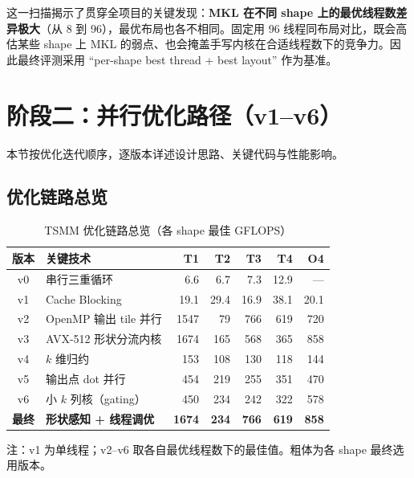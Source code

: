 \documentclass[11pt,a4paper,fontset=fandol]{ctexart}
\begin{document}
这一扫描揭示了贯穿全项目的关键发现：\textbf{MKL 在不同 shape 上的最优线程数差异极大}（从 8 到 96），最优布局也各不相同。固定用 96 线程同布局对比，既会高估某些 shape 上 MKL 的弱点、也会掩盖手写内核在合适线程数下的竞争力。因此最终评测采用 “per-shape best thread + best layout” 作为基准。

\section{阶段二：并行优化路径（v1--v6）}

本节按优化迭代顺序，逐版本详述设计思路、关键代码与性能影响。

\subsection{优化链路总览}
\begin{table}[H]
\centering
\caption{TSMM 优化链路总览（各 shape 最佳 GFLOPS）}
\small
\begin{tabular}{clrrrrr}
\toprule
版本 & 关键技术 & T1 & T2 & T3 & T4 & O4 \\
\midrule
v0 & 串行三重循环 & 6.6 & 6.7 & 7.3 & 12.9 & --- \\
v1 & Cache Blocking & 19.1 & 29.4 & 16.9 & 38.1 & 20.1 \\
v2 & OpenMP 输出 tile 并行 & 1547 & 79 & 766 & 619 & 720 \\
v3 & AVX-512 形状分流内核 & 1674 & 165 & 568 & 365 & 858 \\
v4 & $k$ 维归约 & 153 & 108 & 130 & 118 & 144 \\
v5 & 输出点 dot 并行 & 454 & 219 & 255 & 351 & 470 \\
v6 & 小 $k$ 列核（gating） & 450 & 234 & 242 & 322 & 578 \\
\midrule
\textbf{最终} & \textbf{形状感知 + 线程调优} & \textbf{1674} & \textbf{234} & \textbf{766} & \textbf{619} & \textbf{858} \\
\bottomrule
\end{tabular}
\end{table}
\noindent\footnotesize 注：v1 为单线程；v2--v6 取各自最优线程数下的最佳值。粗体为各 shape 最终选用版本。\normalsize
\end{document}
